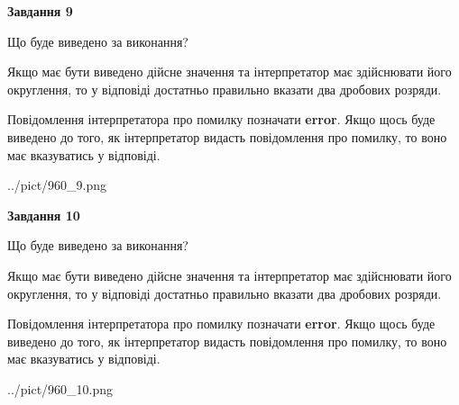 \documentclass[12pt, ukrainian]{article}
\begin{document}
{\begin {Large}
{\begin {center}\textbf{Завдання 9}\end {center}}\par
Що буде виведено за виконання? \par

Якщо має бути виведено дійсне значення та інтерпретатор має здійснювати його округлення, 
то у відповіді достатньо правильно вказати два дробових розряди.

Повідомлення інтерпретатора про помилку позначати \textbf{error}.
Якщо щось буде виведено до того, як інтерпретатор видасть повідомлення про помилку, 
то воно має вказуватись у відповіді. \par

\begin{center}
	{../pict/960_9.png}
\end{center}
\newpage

{\begin {center}\textbf{Завдання 10}\end {center}}\par
Що буде виведено за виконання? \par

Якщо має бути виведено дійсне значення та інтерпретатор має здійснювати його округлення, 
то у відповіді достатньо правильно вказати два дробових розряди.

Повідомлення інтерпретатора про помилку позначати \textbf{error}.
Якщо щось буде виведено до того, як інтерпретатор видасть повідомлення про помилку, 
то воно має вказуватись у відповіді. \par

\begin{center}
	{../pict/960_10.png}
\end{center}
\newpage

\end {Large}}
\end{document}
